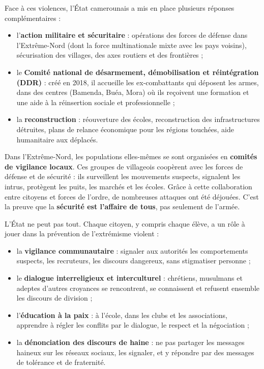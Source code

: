 \documentclass[11pt]{article}
\newcounter{popsec}
\newcounter{popsub}
\newcommand{\courssub}[1]{%
  \stepcounter{popsub}%
  \par\vspace{9pt}\noindent{\popxbold\fontsize{11.5}{13}\selectfont\color{popink}{\color{poporange}\thepopsec.\thepopsub}\hspace{6pt}#1}\par\nopagebreak\vspace{4pt}
}
\begin{document}
Face à ces violences, l'État camerounais a mis en place plusieurs réponses complémentaires :

\begin{itemize}
\item l'\textbf{action militaire et sécuritaire} : opérations des forces de défense dans l'Extrême-Nord (dont la force multinationale mixte avec les pays voisins), sécurisation des villages, des axes routiers et des frontières ;
\item le \textbf{Comité national de désarmement, démobilisation et réintégration (DDR)} : créé en 2018, il accueille les ex-combattants qui déposent les armes, dans des centres (Bamenda, Buéa, Mora) où ils reçoivent une formation et une aide à la réinsertion sociale et professionnelle ;
\item la \textbf{reconstruction} : réouverture des écoles, reconstruction des infrastructures détruites, plans de relance économique pour les régions touchées, aide humanitaire aux déplacés.
\end{itemize}

\begin{savaistu}
Dans l'Extrême-Nord, les populations elles-mêmes se sont organisées en \textbf{comités de vigilance locaux}. Ces groupes de villageois coopèrent avec les forces de défense et de sécurité : ils surveillent les mouvements suspects, signalent les intrus, protègent les puits, les marchés et les écoles. Grâce à cette collaboration entre citoyens et forces de l'ordre, de nombreuses attaques ont été déjouées. C'est la preuve que la \textbf{sécurité est l'affaire de tous}, pas seulement de l'armée.
\end{savaistu}

\courssub{Les réponses citoyennes et préventives}

L'État ne peut pas tout. Chaque citoyen, y compris chaque élève, a un rôle à jouer dans la prévention de l'extrémisme violent :

\begin{itemize}
\item la \textbf{vigilance communautaire} : signaler aux autorités les comportements suspects, les recruteurs, les discours dangereux, sans stigmatiser personne ;
\item le \textbf{dialogue interreligieux et interculturel} : chrétiens, musulmans et adeptes d'autres croyances se rencontrent, se connaissent et refusent ensemble les discours de division ;
\item l'\textbf{éducation à la paix} : à l'école, dans les clubs et les associations, apprendre à régler les conflits par le dialogue, le respect et la négociation ;
\item la \textbf{dénonciation des discours de haine} : ne pas partager les messages haineux sur les réseaux sociaux, les signaler, et y répondre par des messages de tolérance et de fraternité.
\end{itemize}
\end{document}
